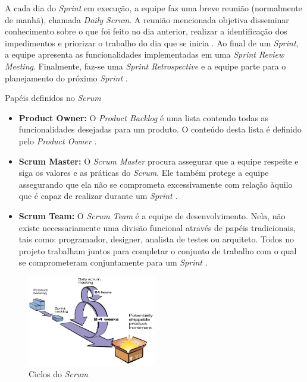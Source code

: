 \documentclass{acm_proc_article-sp}
\begin{document}
A cada dia do \textit{Sprint} em execução, a equipe faz uma breve reunião (normalmente de manhã), chamada \textit{Daily Scrum}. A reunião mencionada objetiva disseminar conhecimento sobre o que foi feito no dia anterior, realizar a identificação dos impedimentos e priorizar o trabalho do dia que se inicia \cite{scrum:agil}. Ao final de um \textit{Sprint}, a equipe apresenta as funcionalidades implementadas em uma \textit{Sprint Review Meeting}. Finalmente, faz-se uma \textit{Sprint Retrospective} e a equipe parte para o planejamento do próximo \textit{Sprint} \cite{scrum:agil}.

Papéis definidos no \textit{Scrum}

\begin{itemize}
\item \textbf{Product Owner:}  O \textit{Product Backlog} é uma lista contendo todas as funcionalidades desejadas para um produto. O conteúdo desta lista é definido pelo \textit{Product Owner} \cite{scrum:agil}.
\item \textbf{Scrum Master:} O \textit{Scrum Master} procura assegurar que a equipe respeite e siga os valores e as práticas do \textit{Scrum}. Ele também protege a equipe assegurando que ela não se comprometa excessivamente com relação àquilo que é capaz de realizar durante um \textit{Sprint} \cite{scrum:agil}.
\item \textbf{Scrum Team:} O \textit{Scrum Team} é a equipe de desenvolvimento. Nela, não existe necessariamente uma divisão funcional através de papéis tradicionais, tais como: programador, designer, analista de testes ou arquiteto. Todos no projeto trabalham juntos para completar o conjunto de trabalho com o qual se comprometeram conjuntamente para um \textit{Sprint} \cite{scrum:agil}.
\end{itemize}


\begin{figure}[h]
\centering %
\includegraphics[width=0.5\textwidth]{scrumCiclo.JPG} %
\caption{Ciclos do \textit{Scrum} \cite{scrum:agil}}
\end{figure}
\end{document}
